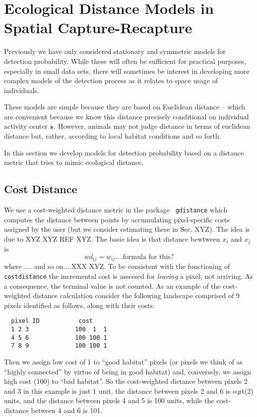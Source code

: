 \chapter{
Ecological Distance Models in Spatial Capture-Recapture
}
\label{chapt.implicit}


\vspace{.3in}


Previously we have only considered stationary and symmetric models for
detection probability. While these will often be sufficient for
practical purposes, especially in small data sets, there will
sometimes be interest in developing more complex models of the
detection process as it relates to space usage of individuals.  

These models are simple because they are based on
Euclidean distance -- which are convenient because we know this
distance precisely conditional on individual activity center ${\bf  s}$.
However, animals may not
judge distance in terms of euclidean distance but, rather, according
to local habitat conditions and so forth. 

In this section we develop models for detection probability based on a
distance metric that tries to mimic ecological distance. 

\section{Cost Distance}

We use a cost-weighted distance metric in the package \mbox{\tt
  gdistance}  which computes the distance between points by
accumulating pixel-specific costs assigned by the user (but we
consider estimating these in Sec. XYZ). The idea is due to XYZ XYZ REF
XYZ. The basic idea is that distance bewtween $x_{i}$ and $x_{j}$ is
\[
 wd_{ij} =  w_{ij} ....\mbox{formula for this?}
\]
where .... and so on....XXX XYZ.
To be consistent with the functioning of \mbox{\tt costdistance} the
incremental cost is assessed for {\it leaving} a pixel, not
arriving. As a consequence, the terminal value is not counted. 
As an example of the cost-weighted distance calculation consider the
following landscape comprised of 9 pixels identified as follows, along
with their costs:
\begin{verbatim}
  pixel ID           cost
  1 2 3             100  1  1 
  4 5 6             100 100 1
  7 8 9             100 100 1
\end{verbatim}
Then we assign low cost of 1 to ``good habitat'' pixels (or pixels we think of as
``highly connected'' by virtue of being in good habitat) and,
conversely, we 
assign high cost (100) to ``bad habitat''. So the cost-weighted distance
between pixels 2 and 3 in this example is just 1 unit, the distance
between pixels 2 and 6 is sqrt(2) units, and the distance between
pixels 4 and 5 is 100 units, while the cost-distance between 4 and 6 is 101.

